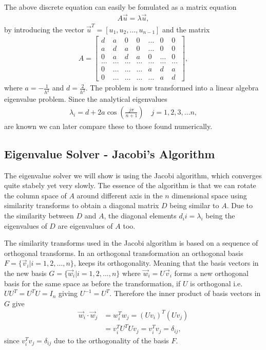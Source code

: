 \documentclass[twocolumn]{aastex62}
\begin{document}
The above discrete equation can easily be fomulated as a matrix equation 
\begin{align}
	A\vec{u} = \lambda\vec{u},
	\label{eq:matrix_eq}
\end{align}
by introducing the vector $\vec{u}^T = [u_1, u_2, \ldots, u_{n-1}]$ and the matrix
\begin{align}
A = 
	\begin{bmatrix} 
	d& a & 0   & 0    & \dots  &0     & 0 \\
    a & d & a & 0    & \dots  &0     &0 \\
    0   & a & d & a  &0       &\dots & 0\\
    \dots  & \dots & \dots & \dots  &\dots      &\dots & \dots\\
    0   & \dots & \dots & \dots  &a  &d & a\\
   0   & \dots & \dots & \dots  &\dots       &a & d
    \end{bmatrix} ,
\end{align}
where $a = -\frac{1}{h^2}$ and $d = \frac{2}{h^2}$.
The problem is now transformed into a linear algebra eigenvalue problem.  Since the analytical eigenvalues 
\begin{align}\label{eq:analyticaleig}
	\lambda_i = d + 2a \cos\left(\frac{j\pi}{n+1}\right)\quad j = 1, 2, 3, \ldots n,
\end{align}
are known we can later compare these to those found numerically.

\subsection{Eigenvalue Solver - Jacobi's Algorithm}
\label{sec:Jacobi}
The eigenvalue solver we will show is using the Jacobi algorithm, which converges quite stabely yet very slowly. The essence of the algorithm is that we can rotate the column space of $A$ around different axis in the $n$ dimensional space using similarity transforms to obtain a diagonal matrix $D$ being similar to $A$. Due to the similarity between $D$ and $A$, the diagonal elements $d_ii = \lambda_i$ being the eigenvalues of $D$ are eigenvalues of $A$ too.

The similarity transforms used in the Jacobi algorithm is based on a sequence of orthogonal transforms. In an orthogonal transformation an orthogonal basis $F = \{\vec{v}_i | i = 1, 2, \ldots, n\}$, keeps its orthogonality. Meaning that the basis vectors in the new basis $G = \{\vec{w}_i | i = 1, 2, \ldots, n\}$ where $\vec{w}_i = U\vec{v}_i$ forms a new orthogonal basis for the same space as before the transformation, if $U$ is orthogonal i.e. $UU^T = U^TU = I_n$ giving $U^{-1} = U^T$. Therefore the inner product of basis vectors in $G$ give 
\begin{align}
	\vec{w}_i\cdot \vec{w}_j &= w_i^Tw_j = (Uv_i)^T(Uv_j) \\
	&= v_i^TU^TUv_j = v_i^Tv_j = \delta_{ij},
\end{align}
since $v_i^Tv_j = \delta_{ij}$ due to the orthogonality of the basis $F$.
\end{document}

